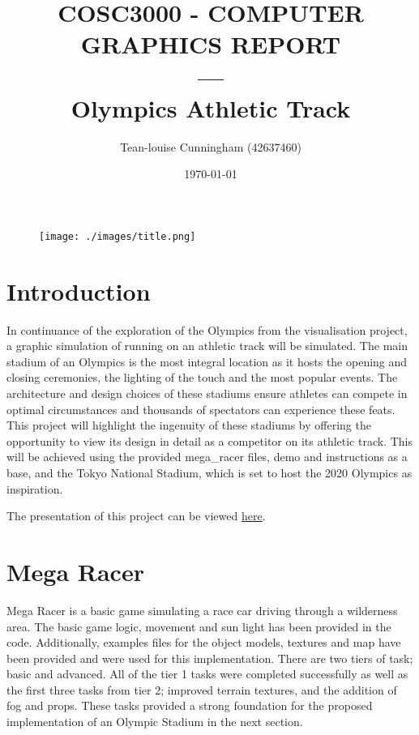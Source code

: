 \documentclass[a4 paper, 12pt]{article}
\title{COSC3000 - COMPUTER GRAPHICS REPORT \\ --- \\Olympics Athletic Track}
\author{Tean-louise Cunningham (42637460)}
\date{\today}
\begin{document}
\maketitle
    \begin{figure} [H]
        \centering
        \texttt{[image: ./images/title.png]}                  
    \end{figure}  


\pagebreak
\tableofcontents
\pagebreak
\listoffigures


\pagebreak
\section{Introduction}
In continuance of the exploration of the Olympics from the visualisation project, a graphic simulation of running on an athletic track will be simulated. The main stadium of an Olympics is the most integral location as it hosts the opening and closing ceremonies, the lighting of the touch and the most popular events. The architecture and design choices of these stadiums ensure athletes can compete in optimal circumstances and thousands of spectators can experience these feats. This project will highlight the ingenuity of these stadiums by offering the opportunity to view its design in detail as a competitor on its athletic track. This will be achieved using the provided mega\_racer files, demo and instructions as a base, and the Tokyo National Stadium, which is set to host the 2020 Olympics as inspiration.

The presentation of this project can be viewed \href{https://www.youtube.com/watch?v=XP5LfHSW7C8}{here}.

\section{Mega Racer}
Mega Racer is a basic game simulating a race car driving through a wilderness area. The basic game logic, movement and sun light has been provided in the code. Additionally, examples files for the object models, textures and map have been provided and were used for this implementation. There are two tiers of task; basic and advanced. All of the tier 1 tasks were completed successfully as well as the first three tasks from tier 2; improved terrain textures, and the addition of fog and props. These tasks provided a strong foundation for the proposed implementation of an Olympic Stadium in the next section.
\end{document}
